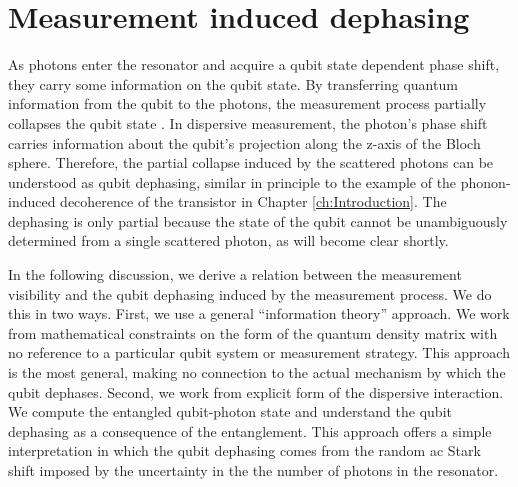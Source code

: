 \section{Measurement induced dephasing} \label{sec:measurementInducedDephasing}

As photons enter the resonator and acquire a qubit state dependent phase shift, they carry some information on the qubit state.
By transferring quantum information from the qubit to the photons, the measurement process partially collapses the qubit state \cite{Murch:trajectories2013}.
In dispersive measurement, the photon's phase shift carries information about the qubit's projection along the z-axis of the Bloch sphere.
Therefore, the partial collapse induced by the scattered photons can be understood as qubit dephasing, similar in principle to the example of the phonon-induced decoherence of the transistor in Chapter \ref{ch:Introduction}.
The dephasing is only partial because the state of the qubit cannot be unambiguously determined from a single scattered photon, as will become clear shortly.

In the following discussion, we derive a relation between the measurement visibility and the qubit dephasing induced by the measurement process.
We do this in two ways.
First, we use a general ``information theory'' approach.
We work from mathematical constraints on the form of the quantum density matrix with no reference to a particular qubit system or measurement strategy.
This approach is the most general, making no connection to the actual mechanism by which the qubit dephases.
Second, we work from explicit form of the dispersive interaction.
We compute the entangled qubit-photon state and understand the qubit dephasing as a consequence of the entanglement.
This approach offers a simple interpretation in which the qubit dephasing comes from the random ac Stark shift imposed by the uncertainty in the the number of photons in the resonator.







